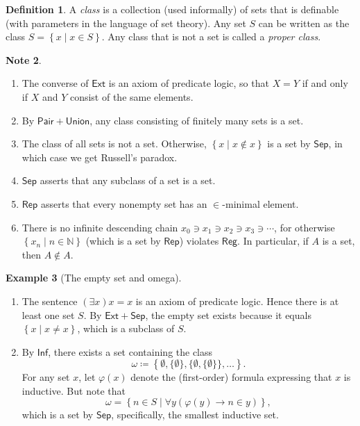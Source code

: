\documentclass[10pt,letterpaper,cm]{nupset}
\theoremstyle{definition}
\newtheorem{definition}{Definition}[subsection]
\newtheorem{exmp}[definition]{Example}
\newtheorem{note}[definition]{Note}
\theoremstyle{theorem}
\theoremstyle{remark}
\newcommand{\N}{\mathbb N}
\newcommand{\1}{\mathbf{1}}
\newcommand{\0}{\vec 0}
\begin{document}
\begin{definition}
 A \textit{class} is a collection (used informally) of sets that is definable (with parameters in the language of set theory).  Any set $S$ can be written as the class $S = \left\{x \mid x \in S\right\}$. Any class that is not a set is called a \textit{proper class}.
\end{definition} 
 
 \begin{note} $ $
\begin{enumerate}
\item The converse of $\mathsf{Ext}$ is an axiom of predicate logic, so that $X= Y$ if and only if $X$ and $Y$ consist of the same elements.
\item By $\mathsf{Pair} + \mathsf{Union}$, any class consisting of finitely many sets is a set.
\item The class of all sets is not a set. Otherwise, $\left\{x \mid x \notin x\right\}$ is a set by $\mathsf{Sep}$, in which case we get Russell's paradox. 
\item $\mathsf{Sep}$ asserts that any subclass of a set is a set.
\item $\mathsf{Rep}$ asserts that every nonempty set has an $\in$-minimal element.
\item There is no infinite descending chain $x_0 \ni x_1 \ni x_2 \ni x_3 \ni \cdots $, for otherwise $\left\{x_n \mid n \in \N\right\}$ (which is a set by $\mathsf{Rep}$) violates $\mathsf{Reg}$. In particular, if $A$ is a set, then $A\notin A$.
\end{enumerate} 
\end{note}
 
\begin{exmp}[The empty set and omega] $ $
\begin{enumerate} 
\item The sentence ${(\exists x)x=x}$ is an axiom of predicate logic. Hence there is at least one set $S$. By $\mathsf{Ext} +\mathsf{Sep}$, the empty set exists because it equals $\left\{x \mid x \ne x\right\}$, which is a subclass of $S$. 
\item By $\mathsf{Inf}$, there exists a set containing the class $$\omega  \coloneqq \left\{\emptyset, \{\emptyset\},  \{ \emptyset, \{\emptyset\}\}, \ldots \right\}.$$ For any set $x$, let $\varphi(x)$ denote the (first-order) formula expressing that $x$ is inductive. But note that $$\omega = \left\{n \in S \mid \forall y(\varphi(y)\rightarrow n \in y)  \right\},$$ which is a set by $\mathsf{Sep}$, specifically, the smallest inductive set.
\end{enumerate}
\end{exmp} 
 
\end{document}

